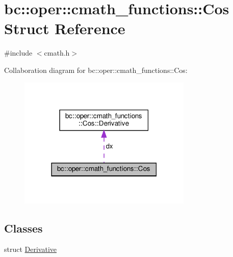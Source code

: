 \hypertarget{structbc_1_1oper_1_1cmath__functions_1_1Cos}{}\section{bc\+:\+:oper\+:\+:cmath\+\_\+functions\+:\+:Cos Struct Reference}
\label{structbc_1_1oper_1_1cmath__functions_1_1Cos}


{\ttfamily \#include $<$cmath.\+h$>$}



Collaboration diagram for bc\+:\+:oper\+:\+:cmath\+\_\+functions\+:\+:Cos\+:\nopagebreak
\begin{figure}[H]
\begin{center}
\leavevmode
\includegraphics[width=234pt]{structbc_1_1oper_1_1cmath__functions_1_1Cos__coll__graph}
\end{center}
\end{figure}
\subsection*{Classes}
\begin{DoxyCompactItemize}
\item 
struct \hyperlink{structbc_1_1oper_1_1cmath__functions_1_1Cos_1_1Derivative}{Derivative}
\end{DoxyCompactItemize}
